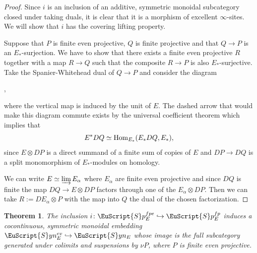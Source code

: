 \documentclass[oneside,a4paper]{amsart}
\newcommand{\euscr}[1]{\EuScript{#1}} %
\newcommand{\Hom}{\textnormal{Hom}} %
\newcommand{\spectra}{\euscr{S}p} %
\newcommand{\synspectra}{\euscr{S}yn} %
\theoremstyle{plain}
\newtheorem{thm}{Theorem}[section]
\theoremstyle{definition}
\theoremstyle{remark}
\begin{document}
\begin{proof}
Since $i$ is an inclusion of an additive, symmetric monoidal subcategory closed under taking duals, it is clear that it is a morphism of excellent $\infty$-sites. We will show that $i$ has the covering lifting property. 

Suppose that $P$ is finite even projective, $Q$ is finite projective and that $Q \rightarrow P$ is an $E_{*}$-surjection. We have to show that there exists  a finite even projective $R$ together with a map $R \rightarrow Q$ such that the composite $R \rightarrow P$ is also $E_{*}$-surjective. Take the Spanier-Whitehead dual of $Q \rightarrow P$ and consider the diagram 

\begin{center}
	,
\end{center}
where the vertical map is induced by the unit of $E$. The dashed arrow that would make this diagram commute exists by the universal coefficient theorem which implies that 
\[
E^{*}DQ \simeq \Hom_{E_{*}}(E_{*}DQ, E_{*}),
\]
since $E \otimes DP$ is a direct summand of a finite sum of copies of $E$ and $DP \rightarrow DQ$ is a split monomorphism of $E_{*}$-modules on homology. 

We can write $E \simeq \varinjlim E_{\alpha}$ where $E_{\alpha}$ are finite even projective and since $DQ$ is finite the map $DQ \rightarrow E \otimes DP$ factors through one of the $E_{\alpha} \otimes DP$. Then we can take $R := DE_{\alpha} \otimes P$ with the map into $Q$ the dual of the chosen factorization. 
\end{proof}

\begin{thm}
\label{thm:synthetic_even_spectra_a_subcategory_of_all_synthetic_spectra}
The inclusion $i \colon \spectra_{E}^{fpe} \hookrightarrow \spectra_{E}^{fp}$ induces a cocontinuous, symmetric monoidal embedding $\synspectra_{E}^{ev} \hookrightarrow \synspectra_{E}$ whose image is the full subcategory generated under colimits and suspensions by $\nu P$, where $P$ is finite even projective. 
\end{thm}
\end{document}
